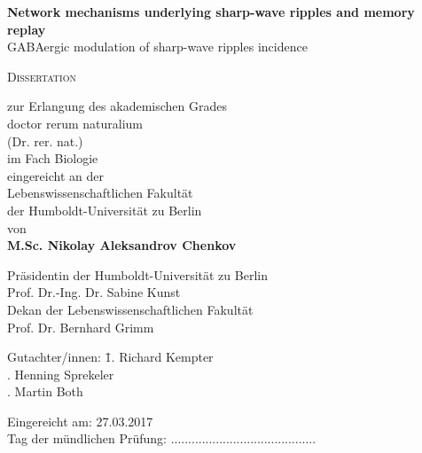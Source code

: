 \begin{titlepage}
\begin{center}
 \huge{\textbf{Network mechanisms underlying sharp-wave ripples and memory replay\\}
 \vspace{5mm}
 {\LARGE GABAergic modulation of sharp-wave ripples incidence}
 }
 

\vspace{1cm} \LARGE{\textsc{Dissertation}}
\end{center}

\begin{center}
  \vspace{1cm} \Large{zur Erlangung des akademischen Grades \\
            doctor rerum naturalium \\ 
            (Dr. rer. nat.) \\ 
            im Fach Biologie
          }
\vspace{1cm} \Large{\\ eingereicht an der \\
            Lebenswissenschaftlichen Fakult\"{a}t \\
            der Humboldt-Universit\"{a}t zu Berlin
          }
\vspace{0.5cm} \Large{ \\ von \\ 
            \textbf{M.Sc. Nikolay Aleksandrov Chenkov}
          }

\end{center}
\vspace{2cm} Pr\"{a}sidentin der Humboldt-Universit\"{a}t zu Berlin \\
            Prof. Dr.-Ing. Dr. Sabine Kunst
\vspace{0.5cm} \\ Dekan der Lebenswissenschaftlichen Fakult\"{a}t \\
            Prof. Dr. Bernhard Grimm  \vspace{0.5cm} 


\begin{spacing}{2}
\begin{tabbing}
Gutachter/innen: \hspace{0,5cm} \=1. Richard Kempter\\
. Henning Sprekeler\\
. Martin Both
 \end{tabbing}
\vspace{0.2cm} 
Eingereicht am: 27.03.2017\\
Tag der mündlichen Prüfung: ..........................................

\end{spacing}	
\newpage
\end{titlepage}

